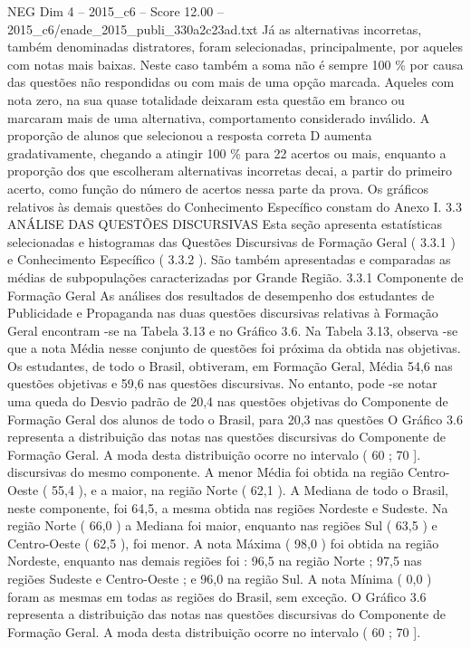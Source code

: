\begin{textsample}{NEG Dim 4 – 2015\_c6 – Score 12.00 – 2015\_c6/enade\_2015\_publi\_330a2c23ad.txt}
Já as alternativas incorretas, também denominadas distratores, foram selecionadas, principalmente, por aqueles com notas mais baixas.
Neste caso também a soma não é sempre 100 \% por causa das questões não respondidas ou com mais de uma opção marcada.
Aqueles com nota zero, na sua quase totalidade deixaram esta questão em branco ou marcaram mais de uma alternativa, comportamento considerado inválido.
A proporção de alunos que selecionou a resposta correta D aumenta gradativamente, chegando a atingir 100 \% para 22 acertos ou mais, enquanto a proporção dos que escolheram alternativas incorretas decai, a partir do primeiro acerto, como função do número de acertos nessa parte da prova.
Os gráficos relativos às demais questões do Conhecimento Específico constam do Anexo I. 3.3 ANÁLISE DAS QUESTÕES DISCURSIVAS Esta seção apresenta estatísticas selecionadas e histogramas das Questões Discursivas de Formação Geral ( 3.3.1 ) e Conhecimento Específico ( 3.3.2 ).
São também apresentadas e comparadas as médias de subpopulações caracterizadas por Grande Região. 3.3.1 Componente de Formação Geral As análises dos resultados de desempenho dos estudantes de Publicidade e Propaganda nas duas questões discursivas relativas à Formação Geral encontram -se na Tabela 3.13 e no Gráfico 3.6.
Na Tabela 3.13, observa -se que a nota Média nesse conjunto de questões foi próxima da obtida nas objetivas.
Os estudantes, de todo o Brasil, obtiveram, em Formação Geral, Média 54,6 nas questões objetivas e 59,6 nas questões discursivas.
No entanto, pode -se notar uma queda do Desvio padrão de 20,4 nas questões objetivas do Componente de Formação Geral dos alunos de todo o Brasil, para 20,3 nas questões O Gráfico 3.6 representa a distribuição das notas nas questões discursivas do Componente de Formação Geral.
A moda desta distribuição ocorre no intervalo ( 60 ; 70 ]. discursivas do mesmo componente.
A menor Média foi obtida na região Centro-Oeste ( 55,4 ), e a maior, na região Norte ( 62,1 ).
A Mediana de todo o Brasil, neste componente, foi 64,5, a mesma obtida nas regiões Nordeste e Sudeste.
Na região Norte ( 66,0 ) a Mediana foi maior, enquanto nas regiões Sul ( 63,5 ) e Centro-Oeste ( 62,5 ), foi menor.
A nota Máxima ( 98,0 ) foi obtida na região Nordeste, enquanto nas demais regiões foi : 96,5 na região Norte ; 97,5 nas regiões Sudeste e Centro-Oeste ; e 96,0 na região Sul.
A nota Mínima ( 0,0 ) foram as mesmas em todas as regiões do Brasil, sem exceção.
O Gráfico 3.6 representa a distribuição das notas nas questões discursivas do Componente de Formação Geral.
A moda desta distribuição ocorre no intervalo ( 60 ; 70 ].

\end{textsample}

